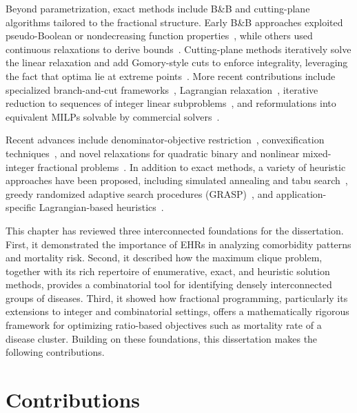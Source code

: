 Beyond parametrization, exact methods include B\&B and cutting-plane
algorithms tailored to the fractional structure. Early B\&B approaches
exploited pseudo-Boolean or nondecreasing function
properties~\citep{robillard1971hyperbolic, agrawal77, saipe1975}, while
others used continuous relaxations to derive
bounds~\citep{bitranmag76}. Cutting-plane methods iteratively solve the
linear relaxation and add Gomory-style cuts to enforce integrality,
leveraging the fact that optima lie at extreme
points~\citep{granot1977integer, grunspan1973hyperbolic, Nemhauser99}.
More recent contributions include specialized branch-and-cut
frameworks~\citep{MENDEZDIAZ2014246}, Lagrangian
relaxation~\citep{Amaldi2012}, iterative reduction to sequences of
integer linear subproblems~\citep{anzai1974integer}, and
reformulations into equivalent MILPs solvable by commercial
solvers~\citep{tawarmalani2002global, Busygin2005, IBARAKI197639}.

Recent advances include denominator-objective
restriction~\citep{ponnaiah2013solving}, convexification
techniques~\citep{he2024convexification}, and novel relaxations for
quadratic binary and nonlinear mixed-integer fractional
problems~\citep{ADAMS200555, ADAMS2007510, adams86, boros2002pseudo,
Sherali2007, CHAOVALITWONGSE2004517, gupte13,
sherali2013reformulation}. In addition to exact methods, a variety of heuristic approaches have been proposed, including simulated annealing and tabu search~\citep{Hansen199097}, greedy randomized adaptive search procedures (GRASP)~\citep{prokopyev2005multiple}, and application-specific Lagrangian-based heuristics~\citep{amiri1999bandwidth}.


This chapter has reviewed three interconnected foundations for the dissertation. First, it demonstrated the importance of EHRs in analyzing comorbidity patterns and mortality risk. Second, it described how the maximum clique problem, together with its rich repertoire of enumerative, exact, and heuristic solution methods, provides a combinatorial tool for identifying densely interconnected groups of diseases. Third, it showed how fractional programming, particularly its extensions to integer and combinatorial settings, offers a mathematically rigorous framework for optimizing ratio-based objectives such as mortality rate of a disease cluster. Building on these foundations, this dissertation makes the following contributions.

\section{Contributions}\label{sec.contributions}

